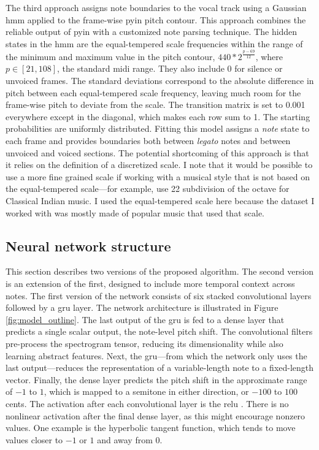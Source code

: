 The third approach assigns note boundaries to the vocal track using a Gaussian \gls{hmm} applied to the frame-wise \gls{pyin} pitch contour. This approach combines the reliable output of \gls{pyin} with a customized note parsing technique. The hidden states in the \gls{hmm} are the equal-tempered scale frequencies within the range of the minimum and maximum value in the pitch contour, $440 * 2^{\frac{p - 69}{12}}$, where $p \in [21, 108]$, the standard \gls{midi} range. They also include 0 for silence or unvoiced frames. The standard deviations correspond to the absolute difference in pitch between each equal-tempered scale frequency, leaving much room for the frame-wise pitch to deviate from the scale. The transition matrix is set to 0.001 everywhere except in the diagonal, which makes each row sum to 1. The starting probabilities are uniformly distributed. Fitting this model assigns a \textit{note} state to each frame and provides boundaries both between \textit{legato} notes and between unvoiced and voiced sections. The potential shortcoming of this approach is that it relies on the definition of a discretized scale. I note that it would be possible to use a more fine grained scale if working with a musical style that is not based on the equal-tempered scale---for example, use 22 subdivision of the octave for Classical Indian music. I used the equal-tempered scale here because the dataset I worked with was mostly made of popular music that used that scale.  

\subsection{Neural network structure}
This section describes two versions of the proposed algorithm. The second version is an extension of the first, designed to include more temporal context across notes. The first version of the network consists of six stacked convolutional layers followed by a \gls{gru} layer. The network architecture is illustrated in Figure \ref{fig:model_outline}. The last output of the \gls{gru} is fed to a dense layer that predicts a single scalar output, the note-level pitch shift. The convolutional filters pre-process the spectrogram tensor, reducing its dimensionality while also learning abstract features. Next, the \gls{gru}---from which the network only uses the last output---reduces the representation of a variable-length note to a fixed-length vector. Finally, the dense layer predicts the pitch shift in the approximate range of $-1$ to $1$, which is mapped to a semitone in either direction, or $-100$ to $100$ cents. The activation after each convolutional layer is the \gls{relu} \cite{he2015delving}. There is no nonlinear activation after the final dense layer, as this might encourage nonzero values. One example is the hyperbolic tangent function, which tends to move values closer to $-1$ or $1$ and away from 0. 

